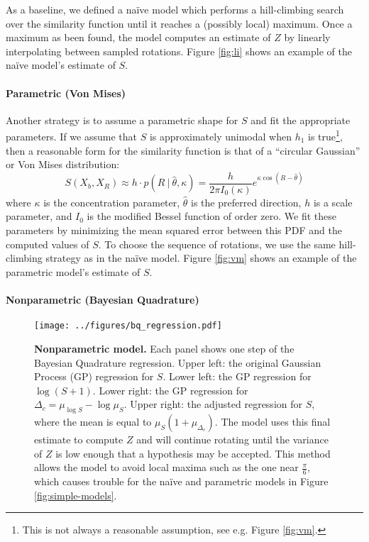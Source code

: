 \documentclass{article} %
\newcommand{\naive}[0]{na\"ive}
\begin{document}
As a baseline, we defined a \naive{} model which performs a
hill-climbing search over the similarity function until it reaches a
(possibly local) maximum. Once a maximum as been found, the model
computes an estimate of $Z$ by linearly interpolating between sampled
rotations. Figure \ref{fig:li} shows an example of the \naive{}
model's estimate of $S$.

\paragraph{Parametric (Von Mises)}

Another strategy is to assume a parametric shape for $S$ and fit the
appropriate parameters. If we assume that $S$ is approximately
unimodal when $h_1$ is true\footnote{This is not always a reasonable
  assumption, see e.g. Figure \ref{fig:vm}.}, then a reasonable form
for the similarity function is that of a ``circular Gaussian'' or Von
Mises distribution:
\begin{equation}
  S(X_b, X_R) \approx h\cdot{}p(R\ \vert\ \hat{\theta}, \kappa)=\frac{h}{2\pi I_0(\kappa)}e^{\kappa\cos(R-\hat{\theta})}
\end{equation}
where $\kappa$ is the concentration parameter, $\hat{\theta}$ is the
preferred direction, $h$ is a scale parameter, and $I_0$ is the
modified Bessel function of order zero. We fit these parameters by
minimizing the mean squared error between this PDF and the computed
values of $S$. To choose the sequence of rotations, we use the same
hill-climbing strategy as in the \naive{} model. Figure \ref{fig:vm}
shows an example of the parametric model's estimate of $S$. 

\paragraph{Nonparametric (Bayesian Quadrature)}

\begin{figure}[t]
  \centering
  \texttt{[image: ../figures/bq\_regression.pdf]}
  \caption{\textbf{Nonparametric model.} Each panel shows one step of
    the Bayesian Quadrature regression. Upper left: the original
    Gaussian Process (GP) regression for $S$. Lower left: the GP
    regression for $\log(S+1)$. Lower right: the GP regression for
    $\Delta_c=\mu_{\log S} - \log \mu_S$. Upper right: the adjusted
    regression for $S$, where the mean is equal to
    $\mu_S(1+\mu_{\Delta_c})$. The model uses this final estimate to
    compute $Z$ and will continue rotating until the variance of $Z$
    is low enough that a hypothesis may be accepted. This method
    allows the model to avoid local maxima such as the one near
    $\frac{\pi}{6}$, which causes trouble for the \naive{} and
    parametric models in Figure \ref{fig:simple-models}.}
  \label{fig:bq}
\end{figure}
\end{document}
